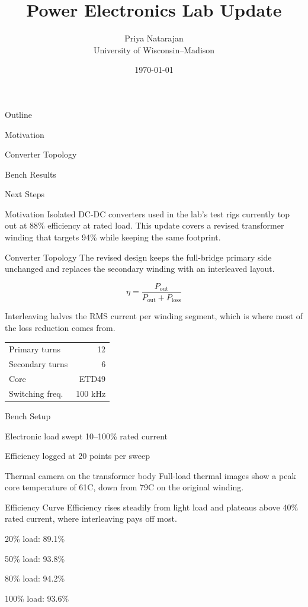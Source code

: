 \documentclass{uwmslide}
\title{Power Electronics Lab Update}
\author{Priya Natarajan \\ University of Wisconsin--Madison}
\date{\today}
\begin{document}
\maketitle

\begin{itemslide}{Outline}
\item Motivation
\item Converter Topology
\item Bench Results
\item Next Steps
\end{itemslide}

\begin{slide}{Motivation}
Isolated DC-DC converters used in the lab's test rigs currently top out at
88\% efficiency at rated load. This update covers a revised transformer
winding that targets 94\% while keeping the same footprint.
\end{slide}

\begin{doubleslide}{Converter Topology}
The revised design keeps the full-bridge primary side unchanged and
replaces the secondary winding with an interleaved layout.

\[
\eta = \frac{P_{\mathrm{out}}}{P_{\mathrm{out}} + P_{\mathrm{loss}}}
\]

Interleaving halves the RMS current per winding segment, which is where
most of the loss reduction comes from.
\slidedivider
\begin{tabular}{lr}
Primary turns & 12 \\
Secondary turns & 6 \\
Core & ETD49 \\
Switching freq. & 100 kHz
\end{tabular}
\end{doubleslide}

\begin{leftitem}{Bench Setup}
\item Electronic load swept 10--100\% rated current
\item Efficiency logged at 20 points per sweep
\item Thermal camera on the transformer body
\slidedivider
Full-load thermal images show a peak core temperature of 61\textdegree C,
down from 79\textdegree C on the original winding.
\end{leftitem}

\begin{rightitem}{Efficiency Curve}
Efficiency rises steadily from light load and plateaus above 40\% rated
current, where interleaving pays off most.
\slidedivider
\item 20\% load: 89.1\%
\item 50\% load: 93.8\%
\item 80\% load: 94.2\%
\item 100\% load: 93.6\%
\end{rightitem}
\end{document}
